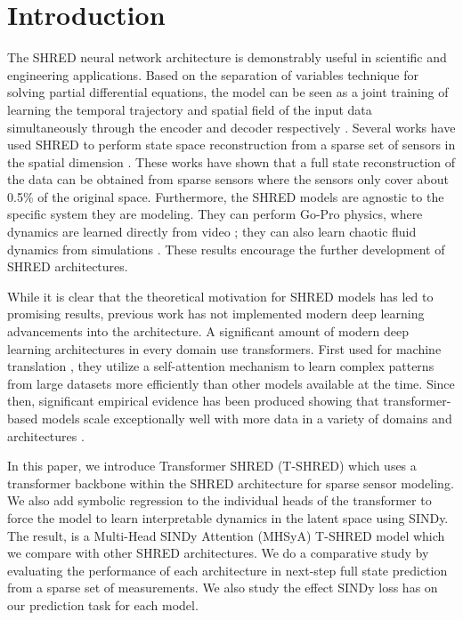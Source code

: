 \documentclass[11pt, a4paper]{article}
\begin{document}
\section{Introduction}

The SHRED neural network architecture is demonstrably useful in scientific and engineering applications. Based on the separation of variables technique for solving partial differential equations, the model can be seen as a joint training of learning the temporal trajectory and spatial field of the input data simultaneously through the encoder and decoder respectively \cite{williams2024sensing}. Several works have used SHRED to perform state space reconstruction from a sparse set of sensors in the spatial dimension \cite{williams2024sensing, tomasetto2025reducedordermodelingshallow, gao2025sparseidentificationnonlineardynamics}. These works have shown that a full state reconstruction of the data can be obtained from sparse sensors where the sensors only cover about 0.5\% of the original space. Furthermore, the SHRED models are agnostic to the specific system they are modeling. They can perform Go-Pro physics, where dynamics are learned directly from video \cite{gao2025sparseidentificationnonlineardynamics, tomasetto2025reducedordermodelingshallow}; they can also learn chaotic fluid dynamics from simulations \cite{tomasetto2025reducedordermodelingshallow, gao2025sparseidentificationnonlineardynamics}. These results encourage the further development of SHRED architectures.

While it is clear that the theoretical motivation for SHRED models has led to promising results, previous work has not implemented modern deep learning advancements into the architecture. A significant amount of modern deep learning architectures in every domain use transformers. First used for machine translation \cite{vaswani2017attention}, they utilize a self-attention mechanism to learn complex patterns from large datasets more efficiently than other models available at the time. Since then, significant empirical evidence has been produced showing that transformer-based models scale exceptionally well with more data in a variety of domains and architectures \cite{Zhai_2022_CVPR, kaplan2020scaling, liang2024scaling}. 

In this paper, we introduce Transformer SHRED (T-SHRED) which uses a transformer backbone within the SHRED architecture for sparse sensor modeling. We also add symbolic regression to the individual heads of the transformer to force the model to learn interpretable dynamics in the latent space using SINDy. The result, is a Multi-Head SINDy Attention (MHSyA) T-SHRED model which we compare with other SHRED architectures. We do a comparative study by evaluating the performance of each architecture in next-step full state prediction from a sparse set of measurements. We also study the effect SINDy loss \cite{gao2025sparseidentificationnonlineardynamics} has on our prediction task for each model.
\end{document}
